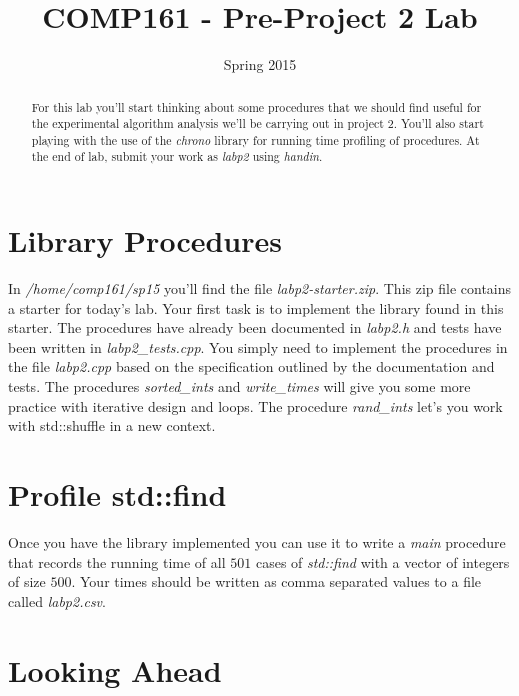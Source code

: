 \documentclass[]{tufte-handout}
\title{COMP161 - Pre-Project 2 Lab}
\author{}
\date{Spring 2015}
\begin{document}
\maketitle

\begin{abstract}
For this lab you'll start thinking about some procedures that we should find useful for the experimental algorithm analysis we'll be carrying out in project 2. You'll also start playing with the use of the \textit{chrono} library for running time profiling of procedures. At the end of lab, submit your work as \textit{labp2} using \textit{handin}. 
\end{abstract}

\section{ Library Procedures }

In \textit{/home/comp161/sp15} you'll find the file \textit{labp2-starter.zip}. This zip file contains a starter for today's lab. Your first task is to implement the library found in this starter. The procedures have already been documented in \textit{labp2.h} and tests have been written in \textit{labp2\_tests.cpp}. You simply need to implement the procedures in the file \textit{labp2.cpp} based on the specification outlined by the documentation and tests.  The procedures \textit{sorted\_ints} and \textit{write\_times} will give you some more practice with iterative design and loops. The procedure \textit{rand\_ints} let's you work with std::shuffle in a new context.

\section{ Profile std::find }

Once you have the library implemented you can use it to write a \textit{main} procedure that records the running time of all $501$ cases of \textit{std::find} with a vector of integers of size $500$. Your times should be written as comma separated values to a file called \textit{labp2.csv}.  

\section{Looking Ahead}
\end{document}
